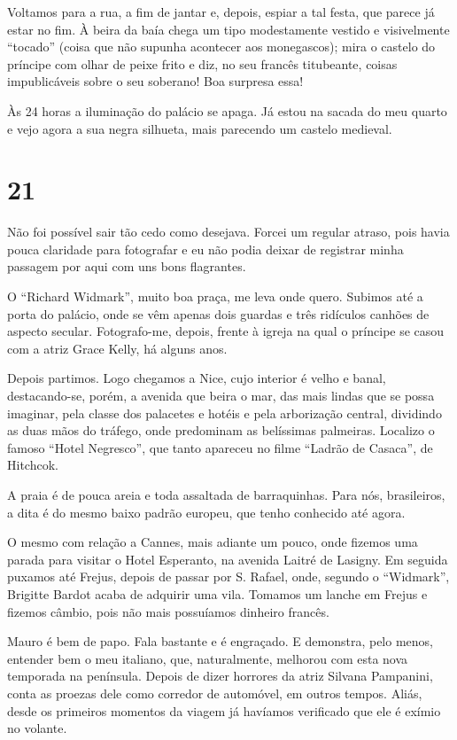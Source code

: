 Voltamos para a rua, a fim de jantar e, depois, espiar a tal festa, que parece já estar no fim. À beira da baía chega um tipo modestamente vestido e visivelmente “tocado” (coisa que não supunha acontecer aos monegascos); mira o castelo do príncipe com olhar de peixe frito e diz, no seu francês titubeante, coisas impublicáveis sobre o seu soberano! Boa surpresa essa!

Às 24 horas a iluminação do palácio se apaga. Já estou na sacada do meu quarto e vejo agora a sua negra silhueta, mais parecendo um castelo medieval.

\section*{21 \adfflatleafright {}}
Não foi possível sair tão cedo como desejava. Forcei um regular atraso, pois havia pouca claridade para fotografar e eu não podia deixar de registrar minha passagem por aqui com uns bons flagrantes.

O “Richard Widmark”, muito boa praça, me leva onde quero. Subimos até a porta do palácio, onde se vêm apenas dois guardas e três ridículos canhões de aspecto secular. Fotografo-me, depois, frente à igreja na qual o príncipe se casou com a atriz Grace Kelly, há alguns anos.

Depois partimos. Logo chegamos a Nice, cujo interior é velho e banal, destacando-se, porém, a avenida que beira o mar, das mais lindas que se possa imaginar, pela classe dos palacetes e hotéis e pela arborização central, dividindo as duas mãos do tráfego, onde predominam as belíssimas palmeiras. Localizo o famoso “Hotel Negresco”, que tanto apareceu no filme “Ladrão de Casaca”, de Hitchcok.

A praia é de pouca areia e toda assaltada de barraquinhas. Para nós, brasileiros, a dita é do mesmo baixo padrão europeu, que tenho conhecido até agora.

O mesmo com relação a Cannes, mais adiante um pouco, onde fizemos uma parada para visitar o Hotel Esperanto, na avenida Laitré de Lasigny. Em seguida puxamos até Frejus, depois de passar por S. Rafael, onde, segundo o “Widmark”, Brigitte Bardot acaba de adquirir uma vila. Tomamos um lanche em Frejus e fizemos câmbio, pois não mais possuíamos dinheiro francês.

Mauro é bem de papo. Fala bastante e é engraçado. E demonstra, pelo menos, entender bem o meu italiano, que, naturalmente, melhorou com esta nova temporada na península. Depois de dizer horrores da atriz Silvana Pampanini, conta as proezas dele como corredor de automóvel, em outros tempos. Aliás, desde os primeiros momentos da viagem já havíamos verificado que ele é exímio no volante.

